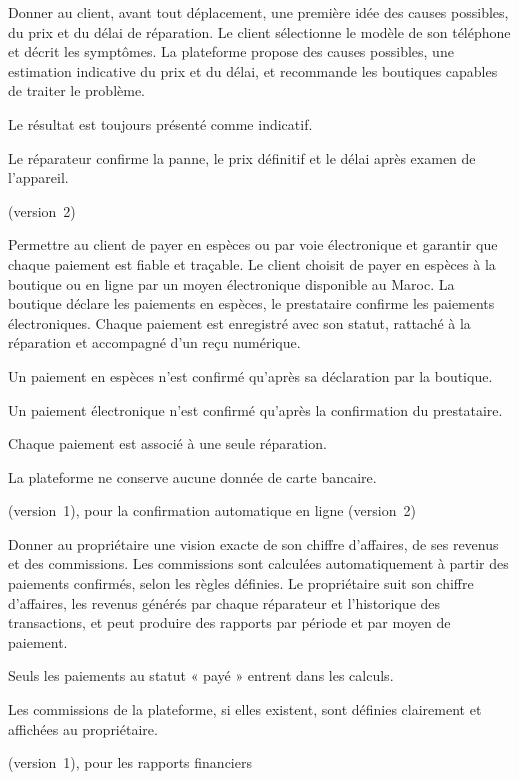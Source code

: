   {Donner au client, avant tout déplacement, une première idée des causes possibles, du prix et du délai de réparation.}
  {Le client sélectionne le modèle de son téléphone et décrit les symptômes. La plateforme propose des causes possibles, une estimation indicative du prix et du délai, et recommande les boutiques capables de traiter le problème.}
  {\begin{cdccellitems}
    \item Le résultat est toujours présenté comme indicatif.
    \item Le réparateur confirme la panne, le prix définitif et le délai après examen de l’appareil.
  \end{cdccellitems}}
  {\prioShould{} (version~2)}

  {Permettre au client de payer en espèces ou par voie électronique et garantir que chaque paiement est fiable et traçable.}
  {Le client choisit de payer en espèces à la boutique ou en ligne par un moyen électronique disponible au Maroc. La boutique déclare les paiements en espèces, le prestataire confirme les paiements électroniques. Chaque paiement est enregistré avec son statut, rattaché à la réparation et accompagné d’un reçu numérique.}
  {\begin{cdccellitems}
    \item Un paiement en espèces n’est confirmé qu’après sa déclaration par la boutique.
    \item Un paiement électronique n’est confirmé qu’après la confirmation du prestataire.
    \item Chaque paiement est associé à une seule réparation.
    \item La plateforme ne conserve aucune donnée de carte bancaire.
  \end{cdccellitems}}
  {\prioMust{} (version~1), \prioShould{} pour la confirmation automatique en ligne (version~2)}

  {Donner au propriétaire une vision exacte de son chiffre d’affaires, de ses revenus et des commissions.}
  {Les commissions sont calculées automatiquement à partir des paiements confirmés, selon les règles définies. Le propriétaire suit son chiffre d’affaires, les revenus générés par chaque réparateur et l’historique des transactions, et peut produire des rapports par période et par moyen de paiement.}
  {\begin{cdccellitems}
    \item Seuls les paiements au statut « payé » entrent dans les calculs.
    \item Les commissions de la plateforme, si elles existent, sont définies clairement et affichées au propriétaire.
  \end{cdccellitems}}
  {\prioMust{} (version~1), \prioShould{} pour les rapports financiers}

